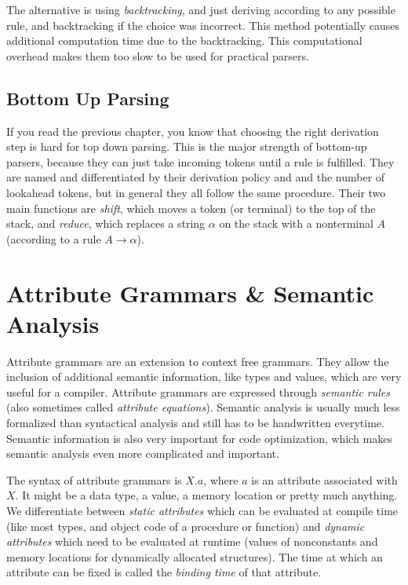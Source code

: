\documentclass{article}
\begin{document}
The alternative is using \emph{backtracking}, and just deriving according to any possible rule, and backtracking if the choice was incorrect.
This method potentially causes additional computation time due to the backtracking.
This computational overhead makes them too slow to be used for practical parsers.

\subsection{Bottom Up Parsing}
If you read the previous chapter, you know that choosing the right derivation step is hard for top down parsing.
This is the major strength of bottom-up parsers, because they can just take incoming tokens until a rule is fulfilled.
They are named and differentiated by their derivation policy and and the number of lookahead tokens, but in general they all follow the same procedure.
Their two main functions are \emph{shift}, which moves a token (or terminal) to the top of the stack, and \emph{reduce}, which replaces a string $\alpha$ on the stack with a nonterminal $A$ (according to a rule $A \rightarrow \alpha$).

\section{Attribute Grammars \& Semantic Analysis}
Attribute grammars are an extension to context free grammars.
They allow the inclusion of additional semantic information, like types and values, which are very useful for a compiler.
Attribute grammars are expressed through \emph{semantic rules} (also sometimes called \emph{attribute equations}).
Semantic analysis is usually much less formalized than syntactical analysis and still has to be handwritten everytime.
Semantic information is also very important for code optimization, which makes semantic analysis even more complicated and important.

The syntax of attribute grammars is $X.a$, where $a$ is an attribute associated with $X$.
It might be a data type, a value, a memory location or pretty much anything.
We differentiate between \emph{static attributes} which can be evaluated at compile time (like most types, and object code of a procedure or function) and \emph{dynamic attributes} which need to be evaluated at runtime (values of nonconstants and memory locations for dynamically allocated structures).
The time at which an attribute can be fixed is called the \emph{binding time} of that attribute.
\end{document}
